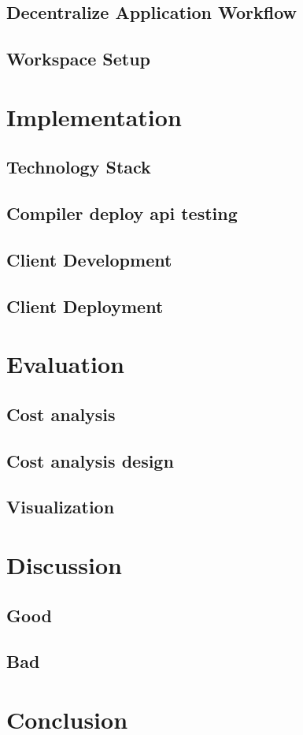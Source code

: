 \documentclass [12pt]{report}
\begin{document}
\section{Decentralize Application Workflow}
\section{Workspace Setup}
\chapter{Implementation}
\section{Technology Stack}
\section{Compiler deploy api testing}
\section{Client Development}
\section{Client Deployment}
\chapter{Evaluation}
\section{Cost analysis}
\section{Cost analysis design}
\section{Visualization}
\chapter{Discussion}
\section{Good}
\section{Bad}
\chapter{Conclusion}


\end{document}
